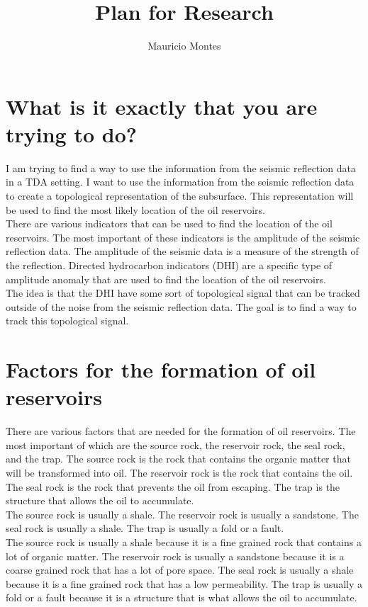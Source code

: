 \documentclass{article}
\begin{document}
\setlength{\parindent}{6pt}


\title{Plan for Research}

\author{Mauricio Montes}

\maketitle

\section{What is it exactly that you are trying to do?}

I am trying to find a way to use the information from the seismic reflection data in a TDA setting.
I want to use the information from the seismic reflection data to create a topological representation of the subsurface.
This representation will be used to find the most likely location of the oil reservoirs. \\ There are
various indicators that can be used to find the location of the oil reservoirs. The most important
of these indicators is the amplitude of the seismic reflection data. The amplitude of the seismic
data is a measure of the strength of the reflection. Directed hydrocarbon indicators (DHI) are a
specific type of amplitude anomaly that are used to find the location of the oil reservoirs. \\ The
idea is that the DHI have some sort of topological signal that can be tracked outside of the noise
from the seismic reflection data. The goal is to find a way to track this topological signal.

\section{Factors for the formation of oil reservoirs}

There are various factors that are needed for the formation of oil reservoirs. The most important of
which are the source rock, the reservoir rock, the seal rock, and the trap. The source rock is the
rock that contains the organic matter that will be transformed into oil. The reservoir rock is the
rock that contains the oil. The seal rock is the rock that prevents the oil from escaping. The trap
is the structure that allows the oil to accumulate. \\ The source rock is usually a shale. The
reservoir rock is usually a sandstone. The seal rock is usually a shale. The trap is usually a fold
or a fault. \\ The source rock is usually a shale because it is a fine grained rock that contains a
lot of organic matter. The reservoir rock is usually a sandstone because it is a coarse grained rock
that has a lot of pore space. The seal rock is usually a shale because it is a fine grained rock
that has a low permeability. The trap is usually a fold or a fault because it is a structure that is
what allows the oil to accumulate. 
\end{document}
